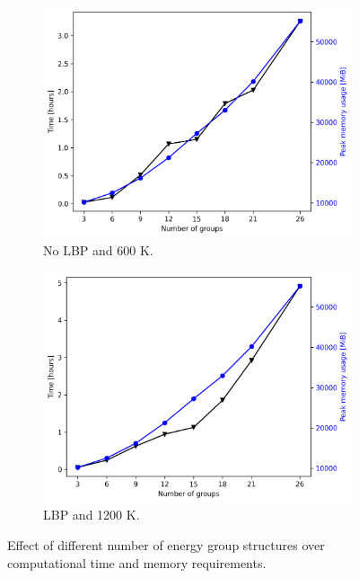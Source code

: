 \documentclass[11pt,letterpaper]{article}
\begin{document}
\begin{figure}[htbp!]
	\centering
	\begin{subfigure}[t]{0.4\textwidth}
		\centering
		\includegraphics[width=\linewidth]{figures/time-noLBP-600}
		\caption{No LBP and 600 K.}
	\end{subfigure}
	\begin{subfigure}[t]{0.4\textwidth}
		\centering
		\includegraphics[width=\linewidth]{figures/time-LBP-1200}
		\caption{LBP and 1200 K.}
	\end{subfigure}
	\hfill
	\caption{Effect of different number of energy group structures over computational time and memory requirements.}
	\label{fig:assembly-time}
\end{figure}
\end{document}
